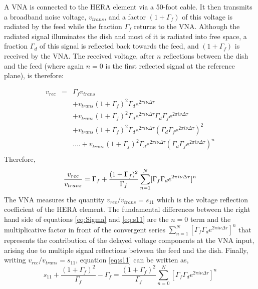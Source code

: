\documentclass[twocolumn]{emulateapj}
\newcommand{\volt}{{v}}
\newcommand{\dfngexp}{{e^{2\pi i\nu \Delta \tau}}}
\begin{document}
 A VNA is connected to the HERA element via a 50-foot cable. It then transmits a broadband noise voltage, $\volt_{trans}$, and a factor $(1+\Gamma_f)$ of this voltage is radiated by the feed while the fraction $\Gamma_{f}$ returns to the VNA. Although the radiated signal illuminates the dish and most of it is radiated into free space, a fraction $\Gamma_d$ of this signal is reflected back towards the feed, and $(1+\Gamma_f)$ is received by the VNA.  The received voltage, after $n$ reflections between the dish and the feed (where again $n=0$ is the first reflected signal at the reference plane), is therefore:

\begin{eqnarray}
\volt_{rec} & = &  \Gamma_f \volt_{trans} \nonumber \\
         && + \volt_{trans} (1+\Gamma_f)^2 \Gamma_{d} \dfngexp \nonumber \\
         && + \volt_{trans} (1+\Gamma_f)^2 \Gamma_{d} \dfngexp \Gamma_d\Gamma_f\dfngexp \nonumber \\
         && + \volt_{trans} (1+\Gamma_f)^2 \Gamma_{d} \dfngexp (\Gamma_d\Gamma_f\dfngexp)^2 \nonumber \\
&&  ....+ \volt_{trans} (1+\Gamma_f)^2 \Gamma_{d} \dfngexp (\Gamma_d\Gamma_f\dfngexp)^n \nonumber \\
\end{eqnarray}
Therefore, 
\begin{equation}
{\volt_{rec}\over \volt_{trans} } = \Gamma_f + \frac{(1+\Gamma_f)^2}{\Gamma_{f}} \displaystyle\sum\limits_{n=1}^{N} [\Gamma_{f}\Gamma_{d}\dfngexp]^{n}
\label{eq:s11}
\end{equation}
The VNA measures the quantity $\volt_{rec}/\volt_{trans}=s_{11}$ which is the voltage reflection coefficient of the HERA element.
The fundamental differences between the right hand side of equations \ref{eq:Sigma} and \ref{eq:s11} are the $n=0$ term and the multiplicative factor in front of the convergent series $\displaystyle\sum\limits_{n=1}^{N} [\Gamma_{f}\Gamma_{d}\dfngexp]^{n}$ that represents the contribution of the delayed voltage components at the VNA input, arising due to multiple signal reflections between the feed and the dish. Finally, writing $\volt_{rec}/\volt_{trans}=s_{11}$, equation \ref{eq:s11} can be written as,
\begin{equation}
s_{11} +\frac{(1+\Gamma_f)^2}{\Gamma_f}-\Gamma_f = \frac{(1+\Gamma_f)^2}{\Gamma_{f}} \displaystyle\sum\limits_{n=0}^{N} [\Gamma_{f}\Gamma_{d}\dfngexp]^{n}
\end{equation}
\end{document}
